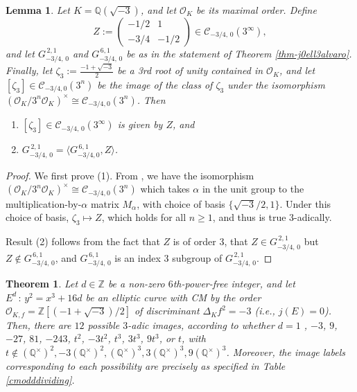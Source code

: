 \documentclass[11pt]{amsart}
\newtheorem{lemma}[defn]{Lemma}
\newtheorem{theorem}[defn]{Theorem}
\theoremstyle{definition}
\newcommand{\Q}{\mathbb Q}
\newcommand{\Z}{\mathbb Z}
\newcommand{\Of}{\mathcal{O}_{K,f}}
\newcommand{\OO}{\mathcal{O}}
\begin{document}
\begin{lemma}\label{lem-zetamat}
    Let $K = \Q(\sqrt{-3})$, and let $\OO_K$ be its maximal order. Define 
    \[ Z := \left( \begin{array}{cc}
        -1/2 & 1 \\ 
        -3/4 & -1/2
    \end{array} \right) \in \mathcal{C}_{-3/4, \, 0}(3^{\infty}), \]
    and let $G^{\, 2,1}_{-3/4, \, 0}$ and $G^{\, 6,1}_{-3/4, \, 0}$ be as in the statement of Theorem \ref{thm-j0ell3alvaro}. Finally, let $\zeta_3 := \frac{-1 + \sqrt{-3}}{2}$ be a 3rd root of unity contained in $\OO_K$, and let $[\zeta_3]\in \mathcal{C}_{-3/4, 0}(3^n)$ be the image of the class of $\zeta_3$ under the isomorphism $(\OO_K/3^n \OO_K)^{\times} \cong \mathcal{C}_{-3/4, 0}(3^n)$. Then
    \begin{enumerate}
        \item $[\zeta_3]\in \mathcal{C}_{-3/4, \, 0}(3^{\infty})$ is given by $Z$, and
        \item $G^{\, 2,1}_{-3/4, \, 0} = 
        \langle G^{\, 6,1}_{-3/4, 0}, Z \rangle$.
    \end{enumerate}

\end{lemma}

\begin{proof}
We first prove (1). From \cite[Remark 2.6]{lozano-galoiscm}, we have the isomorphism $(\OO_K/3^n \OO_K)^{\times} \cong \mathcal{C}_{-3/4, 0}(3^n)$ which takes $\alpha$ in the unit group to the multiplication-by-$\alpha$ matrix $M_{\alpha}$, with choice of basis $\{ \sqrt{-3}/2, 1 \}$. Under this choice of basis, $\zeta_3 \mapsto Z$, which holds for all $n \geq 1$, and thus is true $3$-adically.

Result (2) follows from the fact that $Z$ is of order 3, that $Z \in G^{\, 2,1}_{-3/4, \, 0}$ but $Z \notin G^{\, 6,1}_{-3/4, \, 0}$, and  $G^{\, 6,1}_{-3/4, \, 0}$ is an index 3 subgroup of $G^{\, 2,1}_{-3/4, \, 0}$.

\end{proof}



\begin{theorem}\label{j0ell3-ver}
    Let $d\in \Z$ be a non-zero $6$th-power-free integer, and let $E^d\,:\,y^2=x^3 + 16d$ be an elliptic curve with CM by the order $\Of=\Z[(-1+\sqrt{-3})/2]$ of discriminant $\Delta_K f^2=-3$ (i.e., $j(E)=0$). Then, there are $12$ possible $3$-adic images, according to whether $d = 1$ , $-3$, $9$, $-27$, $81$, $-243$, $t^2$, $-3t^2$, $t^3$, $3t^3$, $9t^3$, or $t$, with $t\notin (\Q^\times)^2, -3(\Q^\times)^2, (\Q^\times)^3, 3(\Q^\times)^3, 9(\Q^\times)^3$. Moreover, the image labels corresponding to each possibility are precisely as specified in Table \ref{cmodddividing}.
\end{theorem}
\end{document}
